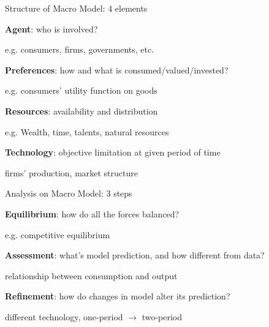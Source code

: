 \documentclass[11pt,aspectratio=169,usenames,dvipsnames]{beamer}
\let\tempone\itemize
\let\temptwo\enditemize
\renewenvironment{itemize}{\tempone\addtolength{\itemsep}{\fill}}{\temptwo}
\let\tempa\enumerate
\let\tempb\endenumerate
\renewenvironment{enumerate}{\tempa\addtolength{\itemsep}{\fill}}{\tempb}
\begin{document}
\begin{frame}{Structure of Macro Model: $ 4 $ elements}
\label{slide:Structure_of_Macro_Model____4___elements}
\begin{enumerate}
    \item \textbf{Agent}: who is involved?
    \begin{itemize}
        \item e.g. consumers, firms, governments, etc.
    \end{itemize}
    \item \textbf{Preferences}: how and what is consumed/valued/invested?
    \begin{itemize}
        \item e.g. consumers' utility function on goods
    \end{itemize}
    \item \textbf{Resources}: availability and distribution
    \begin{itemize}
        \item e.g. Wealth, time, talents, natural resources
    \end{itemize}
    \item \textbf{Technology}: objective limitation at given period of time
    \begin{itemize}
        \item firms' production, market structure
    \end{itemize}
\end{enumerate}
\end{frame}

\begin{frame}{Analysis on Macro Model: $ 3 $ steps}
\label{slide:Analysis_on_Macro_Model____3___steps}
    \begin{enumerate}
        \item \textbf{Equilibrium}: how do all the forces balanced?
        \begin{itemize}
            \item e.g. competitive equilibrium
        \end{itemize}
        \item \textbf{Assessment}: what's model prediction, and how different from data?
        \begin{itemize}
            \item relationship between consumption and output
        \end{itemize}
        \item \textbf{Refinement}: how do changes in model alter its prediction?
        \begin{itemize}
            \item different technology, one-period $ \rightarrow  $ two-period
        \end{itemize}
    \end{enumerate}
\end{frame}
\end{document}
